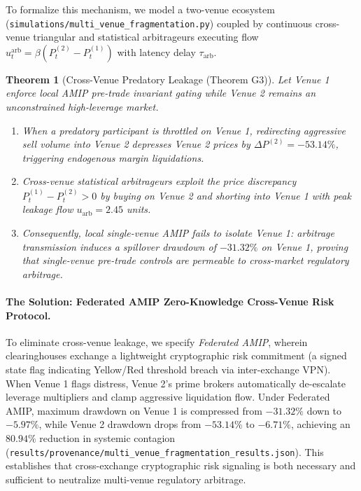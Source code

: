 \documentclass[10pt,twocolumn,letterpaper]{article}
\newtheorem{theorem}{Theorem}[section]
\theoremstyle{definition}
\theoremstyle{remark}
\begin{document}
To formalize this mechanism, we model a two-venue ecosystem (\texttt{simulations/multi\_venue\_fragmentation.py}) coupled by continuous cross-venue triangular and statistical arbitrageurs executing flow $u_t^{\text{arb}} = \beta (P_t^{(2)} - P_t^{(1)})$ with latency delay $\tau_{\text{arb}}$.
\begin{theorem}[Cross-Venue Predatory Leakage (Theorem G3)]
\label{thm:cross_venue_leakage}
Let Venue 1 enforce local AMIP pre-trade invariant gating while Venue 2 remains an unconstrained high-leverage market. 
\begin{enumerate}
    \item When a predatory participant is throttled on Venue 1, redirecting aggressive sell volume into Venue 2 depresses Venue 2 prices by $\Delta P^{(2)} = -53.14\%$, triggering endogenous margin liquidations.
    \item Cross-venue statistical arbitrageurs exploit the price discrepancy $P_t^{(1)} - P_t^{(2)} > 0$ by buying on Venue 2 and shorting into Venue 1 with peak leakage flow $u_{\text{arb}} = 2.45$ units.
    \item Consequently, local single-venue AMIP fails to isolate Venue 1: arbitrage transmission induces a spillover drawdown of $\mathbf{-31.32\%}$ on Venue 1, proving that single-venue pre-trade controls are permeable to cross-market regulatory arbitrage.
\end{enumerate}
\end{theorem}

\paragraph{The Solution: Federated AMIP Zero-Knowledge Cross-Venue Risk Protocol.}
To eliminate cross-venue leakage, we specify \emph{Federated AMIP}, wherein clearinghouses exchange a lightweight cryptographic risk commitment (a signed state flag indicating Yellow/Red threshold breach via inter-exchange VPN). When Venue 1 flags distress, Venue 2's prime brokers automatically de-escalate leverage multipliers and clamp aggressive liquidation flow. Under Federated AMIP, maximum drawdown on Venue 1 is compressed from $-31.32\%$ down to \textbf{$-5.97\%$}, while Venue 2 drawdown drops from $-53.14\%$ to \textbf{$-6.71\%$}, achieving an \textbf{$80.94\%$} reduction in systemic contagion (\texttt{results/provenance/multi\_venue\_fragmentation\_results.json}). This establishes that cross-exchange cryptographic risk signaling is both necessary and sufficient to neutralize multi-venue regulatory arbitrage.
\end{document}
